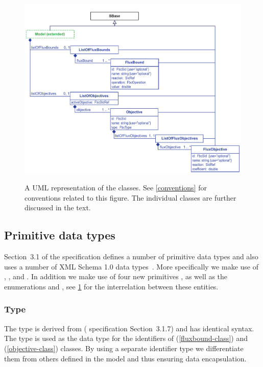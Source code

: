 \begin{figure}[h]
  \centering
  \includegraphics[width=\textwidth]{images/fbc_uml.pdf}\\
  \caption{A UML representation of the \FBCPackage classes. See
  \ref{conventions} for conventions related to this figure. The individual
  classes are further discussed in the text.}
  \label{fig:fbc_uml}
\end{figure}

\subsection{Primitive data types}
\label{primtypes}

Section~3.1 of the \sbmlthreecore specification defines a number of
primitive data types and also uses a number of XML Schema 1.0 data
types~\citep{biron:2000}.  More specifically we make use of
, ,  and .
In addition we make use of four new primitives
,  as well as the enumerations 
and , see \ref{fig:fbc_uml} for the
interrelation between these entities.

\subsubsection{Type }
\label{primtype-fbcsid}

The type  is derived from  (\sbmlthreecore
specification Section~3.1.7) and has identical syntax. The 
type is used as the data type for the identifiers of \FluxBound
(\ref{fluxbound-class}) and \Objective (\ref{objective-class}) classes. By
using a separate identifier type we differentiate them from others defined
in the \SBML model and thus ensuring data encapsulation.

